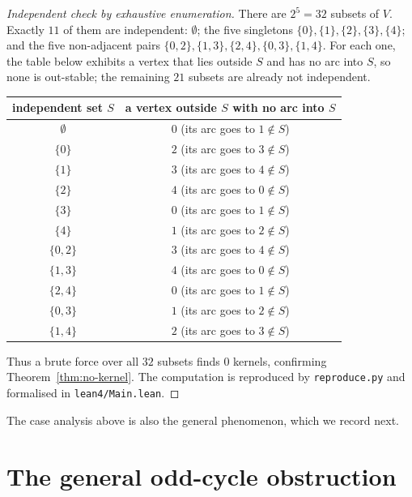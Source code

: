 \documentclass[11pt]{article}
\theoremstyle{definition}
\theoremstyle{remark}
\begin{document}
\begin{proof}[Independent check by exhaustive enumeration]
There are $2^5 = 32$ subsets of $V$. Exactly $11$ of them are independent:
$\emptyset$; the five singletons $\{0\}, \{1\}, \{2\}, \{3\}, \{4\}$; and the
five non-adjacent pairs $\{0,2\}, \{1,3\}, \{2,4\}, \{0,3\}, \{1,4\}$. For each
one, the table below exhibits a vertex that lies outside $S$ and has no arc into
$S$, so none is out-stable; the remaining $21$ subsets are already not
independent.

\begin{center}
\begin{tabular}{c|c}
independent set $S$ & a vertex outside $S$ with no arc into $S$ \\
\hline
$\emptyset$      & $0$ (its arc goes to $1 \notin S$) \\
$\{0\}$          & $2$ (its arc goes to $3 \notin S$) \\
$\{1\}$          & $3$ (its arc goes to $4 \notin S$) \\
$\{2\}$          & $4$ (its arc goes to $0 \notin S$) \\
$\{3\}$          & $0$ (its arc goes to $1 \notin S$) \\
$\{4\}$          & $1$ (its arc goes to $2 \notin S$) \\
$\{0,2\}$        & $3$ (its arc goes to $4 \notin S$) \\
$\{1,3\}$        & $4$ (its arc goes to $0 \notin S$) \\
$\{2,4\}$        & $0$ (its arc goes to $1 \notin S$) \\
$\{0,3\}$        & $1$ (its arc goes to $2 \notin S$) \\
$\{1,4\}$        & $2$ (its arc goes to $3 \notin S$) \\
\end{tabular}
\end{center}

Thus a brute force over all $32$ subsets finds $0$ kernels, confirming
Theorem~\ref{thm:no-kernel}. The computation is reproduced by
\texttt{reproduce.py} and formalised in \texttt{lean4/Main.lean}.
\end{proof}

The case analysis above is also the general phenomenon, which we record next.

\section{The general odd-cycle obstruction}
\end{document}
